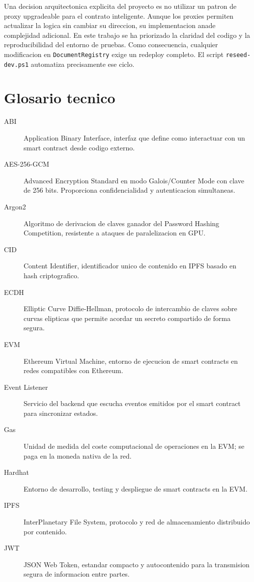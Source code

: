 \documentclass[11pt, a4paper]{article}
\begin{document}
Una decision arquitectonica explicita del proyecto es no utilizar un patron de proxy upgradeable para el contrato inteligente. Aunque los proxies permiten actualizar la logica sin cambiar su direccion, su implementacion anade complejidad adicional. En este trabajo se ha priorizado la claridad del codigo y la reproducibilidad del entorno de pruebas. Como consecuencia, cualquier modificacion en \texttt{DocumentRegistry} exige un redeploy completo. El script \texttt{reseed-dev.ps1} automatiza precisamente ese ciclo.

\section{Glosario tecnico}

\begin{description}
    \item[ABI] Application Binary Interface, interfaz que define como interactuar con un smart contract desde codigo externo.
    \item[AES-256-GCM] Advanced Encryption Standard en modo Galois/Counter Mode con clave de 256 bits. Proporciona confidencialidad y autenticacion simultaneas.
    \item[Argon2] Algoritmo de derivacion de claves ganador del Password Hashing Competition, resistente a ataques de paralelizacion en GPU.
    \item[CID] Content Identifier, identificador unico de contenido en IPFS basado en hash criptografico.
    \item[ECDH] Elliptic Curve Diffie-Hellman, protocolo de intercambio de claves sobre curvas elipticas que permite acordar un secreto compartido de forma segura.
    \item[EVM] Ethereum Virtual Machine, entorno de ejecucion de smart contracts en redes compatibles con Ethereum.
    \item[Event Listener] Servicio del backend que escucha eventos emitidos por el smart contract para sincronizar estados.
    \item[Gas] Unidad de medida del coste computacional de operaciones en la EVM; se paga en la moneda nativa de la red.
    \item[Hardhat] Entorno de desarrollo, testing y despliegue de smart contracts en la EVM.
    \item[IPFS] InterPlanetary File System, protocolo y red de almacenamiento distribuido por contenido.
    \item[JWT] JSON Web Token, estandar compacto y autocontenido para la transmision segura de informacion entre partes.

\end{description}
\end{document}
